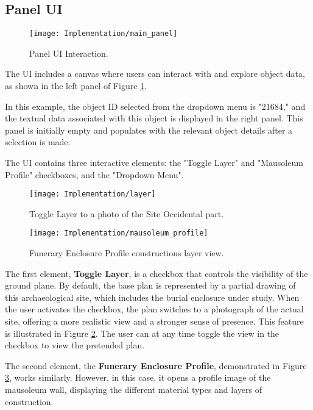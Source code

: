 \subsection*{Panel \gls{UI}}
\label{sec:panel_UI}
\begin{figure}[h!]
    \centering
    \texttt{[image: Implementation/main\_panel]}
    \caption{Panel \gls{UI} Interaction.}
    \label{fig:main_panel}    
\end{figure}

The \gls{UI} includes a canvas where users can interact with and explore object data, as shown in the left panel of Figure \ref{fig:main_panel}. 

In this example, the object ID selected from the dropdown menu is "21684," and the textual data associated with this object is displayed in the right panel. 
This panel is initially empty and populates with the relevant object details after a selection is made. 

The \gls{UI} contains three interactive elements: the "Toggle Layer" and "Mausoleum Profile" checkboxes, and the "Dropdown Menu".

 \begin{figure}[h!]
    \centering
    \texttt{[image: Implementation/layer]}
    \caption{Toggle Layer to a photo of the Site Occidental part.}
    \label{fig:toggle_layer}    
\end{figure}


 \begin{figure}[h!]
    \centering
    \texttt{[image: Implementation/mausoleum\_profile]}
    \caption{Funerary Enclosure Profile constructions layer view.}
    \label{fig:mausoleum_profile}    
\end{figure}

The first element, \textbf{Toggle Layer}, is a checkbox that controls the visibility of the ground plane.
By default, the base plan is represented by a partial drawing of this archaeological site, which includes the burial enclosure under study. 
When the user activates the checkbox, the plan switches to a photograph of the actual site, offering a more realistic view and a stronger sense of presence. 
This feature is illustrated in Figure \ref{fig:toggle_layer}.
The user can at any time toggle the view in the checkbox to view the pretended plan.

The second element, the \textbf{Funerary Enclosure Profile}, demonstrated in Figure \ref{fig:mausoleum_profile}, works similarly. However, in this case, it opens a profile image of the mausoleum wall, displaying the different material types and layers of construction.

